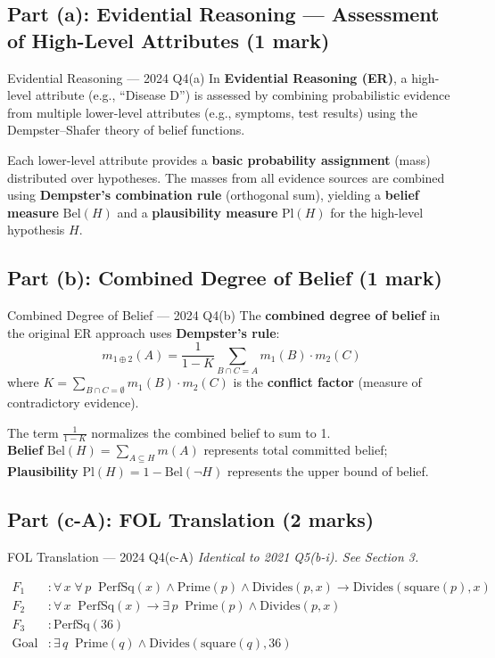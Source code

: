 \documentclass[12pt,a4paper]{article}
\newcommand{\ALL}[1]{\forall\,#1\;}
\newcommand{\EX}[1]{\exists\,#1\;}
\newcommand{\ra}{\rightarrow}
\begin{document}
\subsection{Part (a): Evidential Reasoning --- Assessment of High-Level Attributes (1 mark)}

\begin{solbox}{Evidential Reasoning --- 2024 Q4(a)}
In \textbf{Evidential Reasoning (ER)}, a high-level attribute (e.g., ``Disease D'') is assessed by combining probabilistic evidence from multiple lower-level attributes (e.g., symptoms, test results) using the Dempster--Shafer theory of belief functions.

Each lower-level attribute provides a \textbf{basic probability assignment} (mass) distributed over hypotheses. The masses from all evidence sources are combined using \textbf{Dempster's combination rule} (orthogonal sum), yielding a \textbf{belief measure} $\mathrm{Bel}(H)$ and a \textbf{plausibility measure} $\mathrm{Pl}(H)$ for the high-level hypothesis $H$.
\end{solbox}

\subsection{Part (b): Combined Degree of Belief (1 mark)}

\begin{solbox}{Combined Degree of Belief --- 2024 Q4(b)}
The \textbf{combined degree of belief} in the original ER approach uses \textbf{Dempster's rule}:
\[m_{1\oplus 2}(A) = \frac{1}{1-K}\sum_{B\cap C = A} m_1(B)\cdot m_2(C)\]
where $K = \sum_{B\cap C = \emptyset} m_1(B)\cdot m_2(C)$ is the \textbf{conflict factor} (measure of contradictory evidence).

The term $\frac{1}{1-K}$ normalizes the combined belief to sum to 1.\\
\textbf{Belief} $\mathrm{Bel}(H) = \sum_{A \subseteq H} m(A)$ represents total committed belief; \textbf{Plausibility} $\mathrm{Pl}(H) = 1 - \mathrm{Bel}(\neg H)$ represents the upper bound of belief.
\end{solbox}

\subsection{Part (c-A): FOL Translation (2 marks)}

\begin{solbox}{FOL Translation --- 2024 Q4(c-A)}
\textit{Identical to 2021 Q5(b-i). See Section 3.}

\begin{align*}
  F_1&: \ALL{x}\ALL{p}\;\mathrm{PerfSq}(x) \land \mathrm{Prime}(p) \land \mathrm{Divides}(p,x) \ra \mathrm{Divides}(\mathrm{square}(p),x) \\
  F_2&: \ALL{x}\;\mathrm{PerfSq}(x) \ra \EX{p}\;\mathrm{Prime}(p) \land \mathrm{Divides}(p,x)\\
  F_3&: \mathrm{PerfSq}(36)\\
  \text{Goal}&: \EX{q}\;\mathrm{Prime}(q) \land \mathrm{Divides}(\mathrm{square}(q),36)
\end{align*}
\end{solbox}
\end{document}
